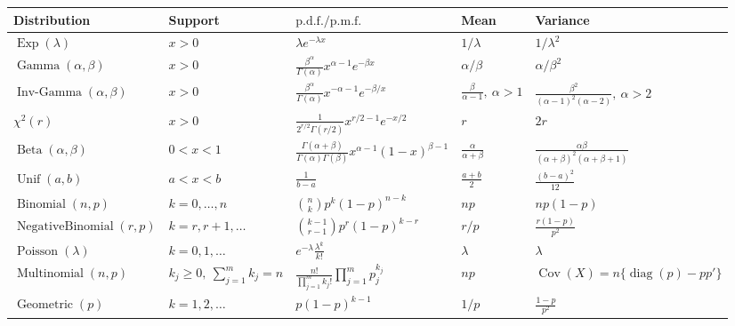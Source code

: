 \documentclass{article}
\theoremstyle{break}
\newcommand{\pdf}{\ensuremath{\mathrm{p.d.f.}}}
\newcommand{\pmf}{\ensuremath{\mathrm{p.m.f.}}}
\DeclareMathOperator{\Cov}{Cov}
\DeclareMathOperator{\Binomial}{Binomial}
\DeclareMathOperator{\Geometric}{Geometric}
\DeclareMathOperator{\Multinomial}{Multinomial}
\DeclareMathOperator{\NegativeBinomial}{NegativeBinomial}
\begin{document}
\begin{center}
\begin{tabular}{|p{}|p{}|p{}|p{}|p{}|}
\hline
\textbf{Distribution} & \textbf{Support} & \textbf{\(\pdf/\pmf\)} & \textbf{Mean} & \textbf{Variance} \\
\hline
\(\operatorname{Exp}(\lambda)\) & \(x>0\) & \(\lambda e^{-\lambda x}\) & \(1/\lambda\) & \(1/\lambda^2\) \\
\hline
\(\operatorname{Gamma}(\alpha,\beta)\) & \(x>0\) & \(\displaystyle \frac{\beta^\alpha}{\Gamma(\alpha)}x^{\alpha-1}e^{-\beta x}\) & \(\alpha/\beta\) & \(\alpha/\beta^2\) \\
\hline
\(\operatorname{Inv\text{-}Gamma}(\alpha,\beta)\) & \(x>0\) & \(\displaystyle \frac{\beta^\alpha}{\Gamma(\alpha)}x^{-\alpha-1}e^{-\beta/x}\) & \(\displaystyle \frac{\beta}{\alpha-1},\ \alpha>1\) & \(\displaystyle \frac{\beta^2}{(\alpha-1)^2(\alpha-2)},\ \alpha>2\) \\
\hline
\(\chi^2(r)\) & \(x>0\) & \(\displaystyle \frac{1}{2^{r/2}\Gamma(r/2)}x^{r/2-1}e^{-x/2}\) & \(r\) & \(2r\) \\
\hline
\(\operatorname{Beta}(\alpha,\beta)\) & \(0<x<1\) & \(\displaystyle \frac{\Gamma(\alpha+\beta)}{\Gamma(\alpha)\Gamma(\beta)}x^{\alpha-1}(1-x)^{\beta-1}\) & \(\displaystyle \frac{\alpha}{\alpha+\beta}\) & \(\displaystyle \frac{\alpha\beta}{(\alpha+\beta)^2(\alpha+\beta+1)}\) \\
\hline
\(\operatorname{Unif}(a,b)\) & \(a<x<b\) & \(\displaystyle \frac{1}{b-a}\) & \(\displaystyle \frac{a+b}{2}\) & \(\displaystyle \frac{(b-a)^2}{12}\) \\
\hline
\(\Binomial(n,p)\) & \(k=0,\ldots,n\) & \(\displaystyle \binom{n}{k}p^k(1-p)^{n-k}\) & \(np\) & \(np(1-p)\) \\
\hline
\(\NegativeBinomial(r,p)\) & \(k=r,r+1,\ldots\) & \(\displaystyle \binom{k-1}{r-1}p^r(1-p)^{k-r}\) & \(r/p\) & \(\displaystyle \frac{r(1-p)}{p^2}\) \\
\hline
\(\operatorname{Poisson}(\lambda)\) & \(k=0,1,\ldots\) & \(\displaystyle e^{-\lambda}\frac{\lambda^k}{k!}\) & \(\lambda\) & \(\lambda\) \\
\hline
\(\Multinomial(n,p)\) & \(k_j\geq 0,\ \sum_{j=1}^m k_j=n\) & \(\displaystyle \frac{n!}{\prod_{j=1}^m k_j!}\prod_{j=1}^m p_j^{k_j}\) & \(np\) & \(\Cov(X)=n\{\operatorname{diag}(p)-pp'\}\) \\
\hline
\(\Geometric(p)\) & \(k=1,2,\ldots\) & \(\displaystyle p(1-p)^{k-1}\) & \(1/p\) & \(\displaystyle \frac{1-p}{p^2}\) \\
\hline
\end{tabular}
\end{center}
\end{document}
